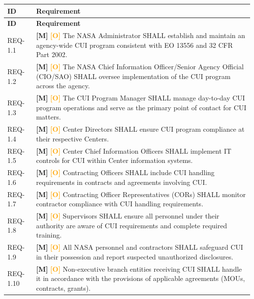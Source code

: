 \documentclass[11pt,letterpaper]{article}
\begin{document}
\begin{longtable}{@{}p{1.4cm}p{11.6cm}@{}}
\toprule
\textbf{ID} & \textbf{Requirement} \\
\midrule
\endfirsthead
\toprule
\textbf{ID} & \textbf{Requirement} \\
\midrule
\endhead

REQ-1.1 & \textcolor{mandatory}{\textbf{[M]}} \textcolor{orange}{\textbf{[O]}} The NASA Administrator SHALL establish and maintain an agency-wide CUI program consistent with EO 13556 and 32 CFR Part 2002. \\[6pt]

REQ-1.2 & \textcolor{mandatory}{\textbf{[M]}} \textcolor{orange}{\textbf{[O]}} The NASA Chief Information Officer/Senior Agency Official (CIO/SAO) SHALL oversee implementation of the CUI program across the agency. \\[6pt]

REQ-1.3 & \textcolor{mandatory}{\textbf{[M]}} \textcolor{orange}{\textbf{[O]}} The CUI Program Manager SHALL manage day-to-day CUI program operations and serve as the primary point of contact for CUI matters. \\[6pt]

REQ-1.4 & \textcolor{mandatory}{\textbf{[M]}} \textcolor{orange}{\textbf{[O]}} Center Directors SHALL ensure CUI program compliance at their respective Centers. \\[6pt]

REQ-1.5 & \textcolor{mandatory}{\textbf{[M]}} \textcolor{orange}{\textbf{[O]}} Center Chief Information Officers SHALL implement IT controls for CUI within Center information systems. \\[6pt]

REQ-1.6 & \textcolor{mandatory}{\textbf{[M]}} \textcolor{orange}{\textbf{[O]}} Contracting Officers SHALL include CUI handling requirements in contracts and agreements involving CUI. \\[6pt]

REQ-1.7 & \textcolor{mandatory}{\textbf{[M]}} \textcolor{orange}{\textbf{[O]}} Contracting Officer Representatives (CORs) SHALL monitor contractor compliance with CUI handling requirements. \\[6pt]

REQ-1.8 & \textcolor{mandatory}{\textbf{[M]}} \textcolor{orange}{\textbf{[O]}} Supervisors SHALL ensure all personnel under their authority are aware of CUI requirements and complete required training. \\[6pt]

REQ-1.9 & \textcolor{mandatory}{\textbf{[M]}} \textcolor{orange}{\textbf{[O]}} All NASA personnel and contractors SHALL safeguard CUI in their possession and report suspected unauthorized disclosures. \\[6pt]

REQ-1.10 & \textcolor{mandatory}{\textbf{[M]}} \textcolor{orange}{\textbf{[O]}} Non-executive branch entities receiving CUI SHALL handle it in accordance with the provisions of applicable agreements (MOUs, contracts, grants). \\[6pt]

\bottomrule
\end{longtable}
\end{document}
